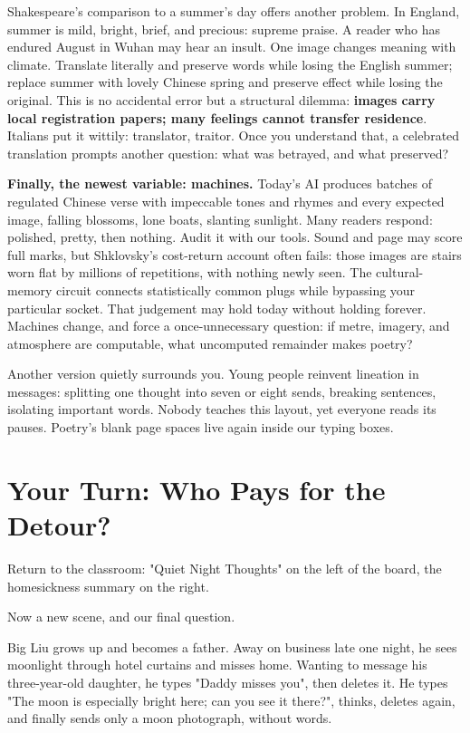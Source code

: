 Shakespeare's comparison to a summer's day offers another problem. In England, summer is mild, bright, brief, and precious: supreme praise. A reader who has endured August in Wuhan may hear an insult. One image changes meaning with climate. Translate literally and preserve words while losing the English summer; replace summer with lovely Chinese spring and preserve effect while losing the original. This is no accidental error but a structural dilemma: \textbf{images carry local registration papers; many feelings cannot transfer residence}. Italians put it wittily: translator, traitor. Once you understand that, a celebrated translation prompts another question: what was betrayed, and what preserved?

\textbf{Finally, the newest variable: machines.} Today's AI produces batches of regulated Chinese verse with impeccable tones and rhymes and every expected image, falling blossoms, lone boats, slanting sunlight. Many readers respond: polished, pretty, then nothing. Audit it with our tools. Sound and page may score full marks, but Shklovsky's cost-return account often fails: those images are stairs worn flat by millions of repetitions, with nothing newly seen. The cultural-memory circuit connects statistically common plugs while bypassing your particular socket. That judgement may hold today without holding forever. Machines change, and force a once-unnecessary question: if metre, imagery, and atmosphere are computable, what uncomputed remainder makes poetry?

Another version quietly surrounds you. Young people reinvent lineation in messages: splitting one thought into seven or eight sends, breaking sentences, isolating important words. Nobody teaches this layout, yet everyone reads its pauses. Poetry's blank page spaces live again inside our typing boxes.

\section{Your Turn: Who Pays for the Detour?}
Return to the classroom: "Quiet Night Thoughts" on the left of the board, the homesickness summary on the right.

Now a new scene, and our final question.

Big Liu grows up and becomes a father. Away on business late one night, he sees moonlight through hotel curtains and misses home. Wanting to message his three-year-old daughter, he types "Daddy misses you", then deletes it. He types "The moon is especially bright here; can you see it there?", thinks, deletes again, and finally sends only a moon photograph, without words.

